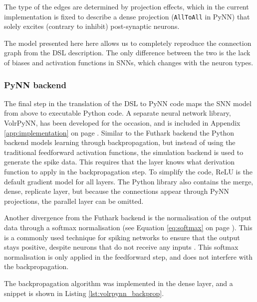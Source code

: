 The type of the edges are determined by projection effects, which
in the current implementation is fixed to describe a 
dense projection (\texttt{AllToAll} in PyNN) that solely
excites (contrary to inhibit) post-synaptic neurons.

The model presented here here allows us to completely reproduce the connection
graph from the \gls{DSL} description.
The only difference between the two is the lack of biases and activation functions
in \glspl{SNN}, which changes with the neuron types.

\subsubsection{PyNN backend}
The final step in the translation of the \gls{DSL} to PyNN code maps the
\gls{SNN} model from above to executable Python code.
A separate neural network library, VolrPyNN, has been developed for the
occasion, and is included in Appendix \ref{app:implementation} on page
\pageref{app:implementation_volrpynn}.
Similar to the Futhark backend the Python backend models learning through
backpropagation, but instead of using the traditional feedforward activation
functions, the simulation backend is used to generate the spike data.
This requires that the layer knows what derivation function to apply in
the backpropagation step.
To simplify the code, ReLU is the default gradient model for all layers.
The Python library also contains the merge, dense,
replicate layer, but because the connections appear through
PyNN projections, the parallel layer can be omitted.

Another divergence from the Futhark backend is the normalisation of the
output data through a softmax normalisation (see Equation \ref{eq:softmax} on
page \pageref{eq:softmax}).
This is a commonly used technique for spiking networks to ensure that the 
output stays positive, despite neurons that do not receive any inputs 
\cite{Rueckauer2017}.
This softmax normalisation is only applied in the feedforward step, and does
not interfere with the backpropagation.

The backpropagation algorithm was implemented in the dense layer, and a snippet
is shown in Listing \ref{lst:volrpynn_backprop}.

